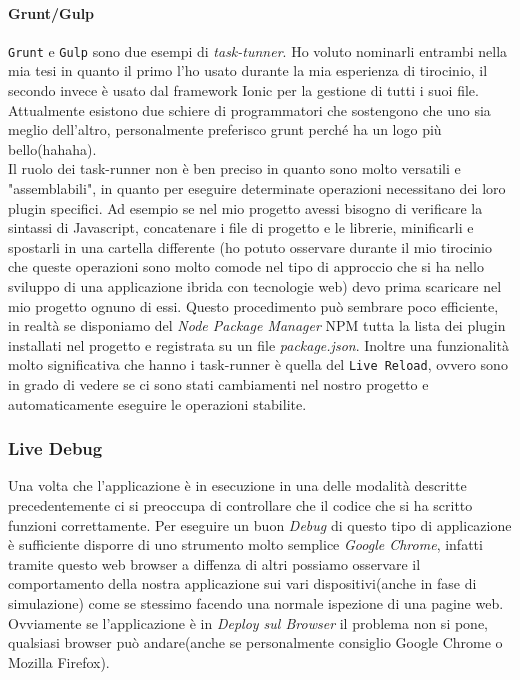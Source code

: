 \paragraph{Grunt/Gulp} \texttt{Grunt} e \texttt{Gulp} sono due esempi di \emph{task-tunner}. Ho voluto nominarli entrambi nella mia tesi in quanto il primo l'ho usato durante la mia esperienza di tirocinio, il secondo invece è usato dal framework  Ionic per la gestione di tutti i suoi file. Attualmente esistono due schiere di programmatori che sostengono che uno sia meglio dell'altro, personalmente preferisco grunt perché ha un logo più bello(hahaha).\\
Il ruolo dei task-runner non è ben preciso in quanto sono molto versatili e "assemblabili", in quanto per eseguire determinate operazioni necessitano dei loro plugin specifici. Ad esempio se nel mio progetto avessi bisogno di verificare la sintassi di Javascript, concatenare i file di progetto e le librerie, minificarli e spostarli in una cartella differente (ho potuto osservare durante il mio tirocinio che queste operazioni sono molto comode nel tipo di approccio che si ha nello sviluppo di una applicazione ibrida con tecnologie web) devo prima scaricare nel mio progetto ognuno di essi. Questo procedimento può sembrare poco efficiente, in realtà se disponiamo del \emph{Node Package Manager} NPM tutta la lista dei plugin installati nel progetto e registrata su un file \emph{package.json}. Inoltre una funzionalità molto significativa che hanno i task-runner è quella del \texttt{Live Reload}, ovvero sono in grado di vedere se ci sono stati cambiamenti nel nostro progetto e automaticamente eseguire le operazioni stabilite.
\subsubsection{Live Debug}
Una volta che l'applicazione è in esecuzione in una delle modalità descritte precedentemente ci si preoccupa di controllare che il codice che si ha scritto funzioni correttamente. Per eseguire un buon \emph{Debug} di questo tipo di applicazione è sufficiente disporre di uno strumento molto semplice \emph{Google Chrome}, infatti tramite questo web browser a diffenza di altri possiamo osservare il comportamento della nostra applicazione sui vari dispositivi(anche in fase di simulazione) come se stessimo facendo una normale ispezione di una pagine web. Ovviamente se l'applicazione è in \emph{Deploy sul Browser} il problema non si pone, qualsiasi browser può andare(anche se personalmente consiglio Google Chrome o Mozilla Firefox).
